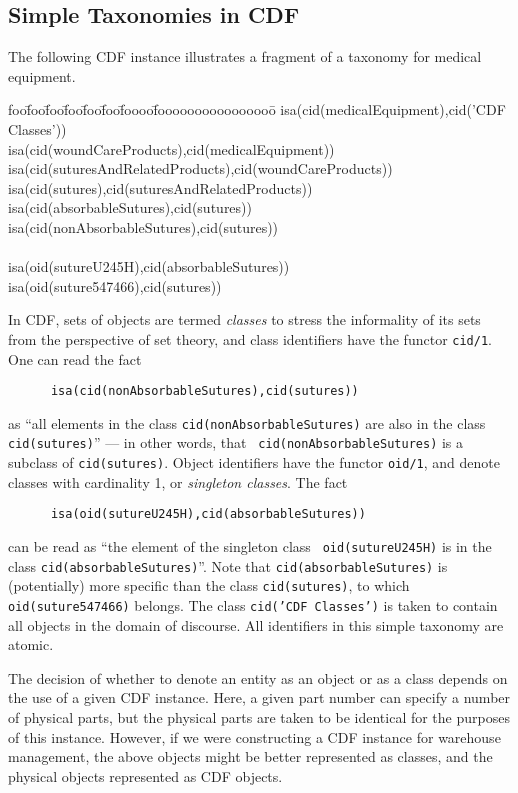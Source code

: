 \subsection{Simple Taxonomies in CDF}

\begin{example} \rm \label{ex:suture1}
The following CDF instance illustrates a fragment of a taxonomy for
medical equipment.
{\tt  {\small 
\begin{tabbing}
foo\=foo\=foo\=foo\=foo\=foo\=foooo\=foooooooooooooooo\=\kill
isa(cid(medicalEquipment),cid('CDF Classes'))  \\
\> isa(cid(woundCareProducts),cid(medicalEquipment)) \\
\> \> \>  isa(cid(suturesAndRelatedProducts),cid(woundCareProducts)) \\
\> \> \> isa(cid(sutures),cid(suturesAndRelatedProducts))  \\
\> \> \> \> isa(cid(absorbableSutures),cid(sutures))  \\
\> \> \> \> isa(cid(nonAbsorbableSutures),cid(sutures)) \\
\> \\
\> \> \>   isa(oid(sutureU245H),cid(absorbableSutures))  \\
\> \> \> \> \>   isa(oid(suture547466),cid(sutures)) 
\end{tabbing} }} 
\noindent
In CDF, sets of objects are termed {\em classes} to stress the
informality of its sets from the perspective of set theory, and class
identifiers have the functor {\tt cid/1}.  One can read the fact
\begin{verbatim}
      isa(cid(nonAbsorbableSutures),cid(sutures))
\end{verbatim}
as ``all elements in the class {\tt cid(nonAbsorbableSutures)} are
also in the class {\tt cid(sutures)}'' --- in other words, that {\tt
cid(nonAbsorbableSutures)} is a subclass of {\tt cid(sutures)}.
Object identifiers have the functor {\tt oid/1}, and denote classes
with cardinality 1, or {\em singleton classes}.  The fact
\begin{verbatim}
      isa(oid(sutureU245H),cid(absorbableSutures))
\end{verbatim}
can be read as ``the element of the singleton class {\tt
oid(sutureU245H)} is in the class {\tt cid(absorbableSutures)}''.
Note that {\tt cid(absorbableSutures)} is (potentially) more specific
than the class {\tt cid(sutures)}, to which {\tt oid(suture547466)}
belongs.  The class {\tt cid('CDF Classes')} is taken to contain all
objects in the domain of discourse.  All identifiers in this simple
taxonomy are atomic.

The decision of whether to denote an entity as an object or as a class
depends on the use of a given CDF instance.  Here, a given part number
can specify a number of physical parts, but the physical parts are
taken to be identical for the purposes of this instance.  However, if
we were constructing a CDF instance for warehouse management, the
above objects might be better represented as classes, and the physical
objects represented as CDF objects.
\end{example} 

